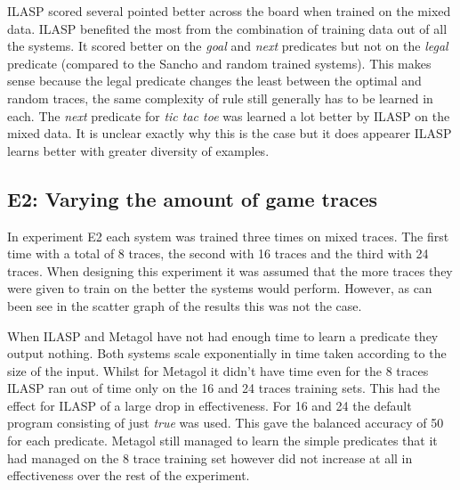 ILASP scored several pointed better across the board when trained on the mixed data. ILASP benefited the most from the combination of training data out of all the systems. It scored better on the \textit{goal} and \textit{next} predicates but not on the \textit{legal} predicate (compared to the Sancho and random trained systems). This makes sense because the legal predicate changes the least between the optimal and random traces, the same complexity of rule still generally has to be learned in each. The \textit{next} predicate for \textit{tic tac toe} was learned a lot better by ILASP on the mixed data. It is unclear exactly why this is the case but it does appearer ILASP learns better with greater diversity of examples. 


\subsection{E2: Varying the amount of game traces}
In experiment E2 each system was trained three times on mixed traces. The first time with a total of 8 traces, the second with 16 traces and the third with 24 traces. When designing this experiment it was assumed that the more traces they were given to train on the better the systems would perform. However, as can been see in the scatter graph of the results this was not the case.
When ILASP and Metagol have not had enough time to learn a predicate they output nothing. Both systems scale exponentially in time taken according to the size of the input. Whilst for Metagol it didn't have time even for the 8 traces ILASP ran out of time only on the 16 and 24 traces training sets. This had the effect for ILASP of a large drop in effectiveness. For 16 and 24 the default program consisting of just \textit{true} was used. This gave the balanced accuracy of 50 for each predicate. Metagol still managed to learn the simple predicates that it had managed on the 8 trace training set however did not increase at all in effectiveness over the rest of the experiment.

